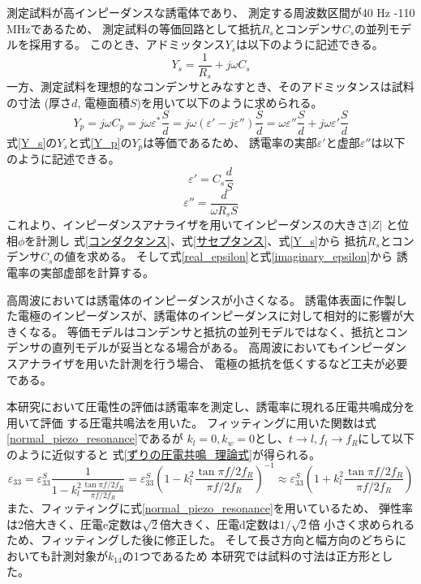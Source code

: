 \documentclass[dvipdfmx,12pt,a4paper]{jreport}
\begin{document}
			測定試料が高インピーダンスな誘電体であり、
			測定する周波数区間が40 Hz -110 MHzであるため、
			測定試料の等価回路として抵抗$R_s$とコンデンサ$C_s$の並列モデルを採用する。
			このとき、アドミッタンス$Y_s$は以下のように記述できる。
			\begin{equation}
				Y_s = \frac{1}{R_s}+j\omega C_s
				\label{Y_s}
			\end{equation}
			一方、測定試料を理想的なコンデンサとみなすとき、そのアドミッタンスは試料の寸法
			(厚さ$d$, 電極面積$S$)を用いて以下のように求められる。
			\begin{equation}
				Y_p= j \omega C_p = j \omega \varepsilon^{*} \frac{S}{d} = 
				j\omega (\varepsilon'-j\varepsilon'')\frac{S}{d} =
				\omega\varepsilon''\frac{S}{d} + j\omega \varepsilon' \frac{S}{d}
				\label{Y_p}
			\end{equation}
			式\ref{Y_s}の$Y_s$と式\ref{Y_p}の$Y_p$は等価であるため、
			誘電率の実部$\varepsilon'$と虚部$\varepsilon''$は以下のように記述できる。
			\begin{equation}
				\varepsilon' = C_s \frac{d}{S}
				\label{real_epsilon}
			\end{equation}
			\begin{equation}
				\varepsilon'' = \frac{d}{\omega R_s S}
				\label{imaginary_epsilon}
			\end{equation}
			これより、インピーダンスアナライザを用いてインピーダンスの大きさ$|Z|$
			と位相$\phi$を計測し
			式\ref{コンダクタンス}、式\ref{サセプタンス}、式\ref{Y_s}から
			抵抗$R_s$とコンデンサ$C_s$の値を求める。
			そして式\ref{real_epsilon}と式\ref{imaginary_epsilon}から
			誘電率の実部虚部を計算する。
			
			高周波においては誘電体のインピーダンスが小さくなる。
			誘電体表面に作製した電極のインピーダンスが、誘電体のインピーダンスに対して相対的に影響が大きくなる。
			等価モデルはコンデンサと抵抗の並列モデルではなく、抵抗とコンデンサの直列モデルが妥当となる場合がある。
			高周波においてもインピーダンスアナライザを用いた計測を行う場合、
			電極の抵抗を低くするなど工夫が必要である。
			
			本研究において圧電性の評価は誘電率を測定し、誘電率に現れる圧電共鳴成分を用いて評価
			する圧電共鳴法を用いた。
			フィッティングに用いた関数は式\ref{normal_piezo_resonance}であるが
			$k_l=0, k_w=0$とし、$t\rightarrow l, f_t \rightarrow f_R$にして以下のように近似すると
			式\ref{ずりの圧電共鳴_理論式}が得られる。
			\begin{equation}
				\varepsilon_{33} =
				\varepsilon_{33}^S
				\frac{1}{1-k_l^2\frac{\tan{\pi f/2f_R}}{\pi f/2f_R}}
				= \varepsilon_{33}^S\left(1-k_l^2\frac{\tan{\pi f/2f_R}}{\pi f/2f_R}\right)^{-1}
				\approx \varepsilon_{33}^S\left(1+k_l^2\frac{\tan{\pi f/2f_R}}{\pi f/2f_R}\right)
			\end{equation}
			また、フィッティングに式\ref{normal_piezo_resonance}を用いているため、
			弾性率は2倍大きく、圧電e定数は$\sqrt{2}$倍大きく、圧電d定数は$1/\sqrt{2}$倍
			小さく求められるため、フィッティングした後に修正した。
			そして長さ方向と幅方向のどちらにおいても計測対象が$k_{14}$の1つであるため
			本研究では試料の寸法は正方形とした。
			\newpage
\end{document}
